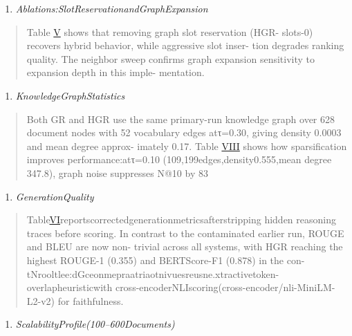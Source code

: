 \documentclass[
]{article}
\begin{document}
\begin{enumerate}
\def\labelenumi{\Alph{enumi}.}
\setcounter{enumi}{3}
\item
  \emph{Ablations:SlotReservationandGraphExpansion}
\end{enumerate}

\begin{quote}
Table \hyperref[_bookmark12]{V} shows that removing graph slot reservation (HGR- slots-0) recovers hybrid behavior, while aggressive slot inser- tion degrades ranking quality. The neighbor sweep confirms graph expansion sensitivity to expansion depth in this imple- mentation.
\end{quote}

\begin{enumerate}
\def\labelenumi{\Alph{enumi}.}
\setcounter{enumi}{4}
\item
  \emph{KnowledgeGraphStatistics}
\end{enumerate}

\begin{quote}
Both GR and HGR use the same primary-run knowledge graph over 628 document nodes with 52 vocabulary edges atτ=0.30, giving density 0.0003 and mean degree approx- imately 0.17. Table \hyperref[_bookmark18]{VIII} shows how sparsification improves performance:atτ=0.10 (109,199edges,density0.555,mean degree 347.8), graph noise suppresses N@10 by 83
\end{quote}

\begin{enumerate}
\def\labelenumi{\Alph{enumi}.}
\setcounter{enumi}{5}
\item
  \emph{GenerationQuality}
\end{enumerate}

\begin{quote}
Table\hyperref[_bookmark14]{VI}reportscorrectedgenerationmetricsafterstripping hidden reasoning traces before scoring. In contrast to the contaminated earlier run, ROUGE and BLEU are now non- trivial across all systems, with HGR reaching the highest ROUGE-1 (0.355) and BERTScore-F1 (0.878) in the con- tNrooltlee:dGceonmepraatriaotnivuesreusne.xtractivetoken-overlapheuristicwith cross-encoderNLIscoring(cross-encoder/nli-MiniLM-L2-v2) for faithfulness.
\end{quote}

\begin{enumerate}
\def\labelenumi{\Alph{enumi}.}
\setcounter{enumi}{6}
\item
  \emph{ScalabilityProfile(100--600Documents)}
\end{enumerate}
\end{document}
